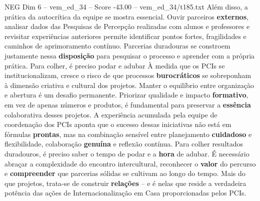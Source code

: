 \begin{textsample}{NEG Dim 6 – vem\_ed\_34 – Score -43.00 – vem\_ed\_34/t185.txt}
Além disso, a prática da autocrítica da equipe se mostra essencial.
Ouvir parceiros \textbf{externos}, analisar dados das Pesquisas de Percepção realizadas com alunos e professores e revisitar experiências anteriores permite identificar pontos fortes, fragilidades e caminhos de aprimoramento contínuo.
Parcerias duradouras se constroem justamente nessa \textbf{disposição} para pesquisar o processo e aprender com a própria prática.
Para colher, é preciso podar e adubar À medida que os PCIs se institucionalizam, cresce o risco de que processos \textbf{burocráticos} se sobreponham à dimensão criativa e cultural dos projetos.
Manter o equilíbrio entre organização e abertura é um desafio permanente.
Priorizar qualidade e impacto \textbf{formativo}, em vez de apenas números e produtos, é fundamental para preservar a \textbf{essência} colaborativa desses projetos.
A experiência acumulada pela equipe de coordenação dos PCIs aponta que o sucesso dessas iniciativas não está em fórmulas \textbf{prontas}, mas na combinação sensível entre planejamento \textbf{cuidadoso} e flexibilidade, colaboração \textbf{genuína} e reflexão contínua.
Para colher resultados duradouros, é preciso saber o tempo de podar e a \textbf{hora} de adubar.
É necessário abraçar a complexidade do encontro intercultural, reconhecer o \textbf{valor} do percurso e \textbf{compreender} que parcerias sólidas se cultivam ao longo do tempo.
Mais do que projetos, trata-se de construir \textbf{relações} – e é nelas que reside a verdadeira potência das ações de Internacionalização em Casa proporcionadas pelos PCIs.

\end{textsample}
